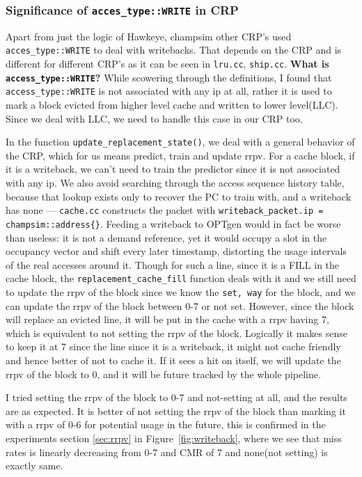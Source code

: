 \documentclass[11pt]{article}
\begin{document}
\subsubsection{Significance of \texttt{acces\_type::WRITE} in CRP} \label{sec:writeback}

Apart from just the logic of Hawkeye, champsim other CRP's used \texttt{acces\_type::WRITE} to deal with writebacks. That depends on the CRP and is different for different CRP's as it can be seen in \texttt{lru.cc}, \texttt{ship.cc}.
\textbf{What is \texttt{access\_type::WRITE}?} While scowering through the definitions, I found that \texttt{access\_type::WRITE} is not associated with any ip at all, rather it is used to mark a block evicted from higher level cache and written to lower level(LLC). Since we deal with LLC, we need to handle this case in our CRP too.  

In the function \texttt{update\_replacement\_state()}, we deal with a general behavior of the CRP, which for us means predict, train and update rrpv. For a cache block, if it is a writeback, we can't need to train the predictor since it is not associated with any ip. We also avoid searching through the access sequence history table, because that lookup
exists only to recover the PC to train with, and a writeback has none --- \texttt{cache.cc}
constructs the packet with \verb|writeback_packet.ip = champsim::address{}|. Feeding a
writeback to OPTgen would in fact be worse than useless: it is not a demand reference, yet
it would occupy a slot in the occupancy vector and shift every later timestamp, distorting
the usage intervals of the real accesses around it. Though for such a line, since it is a FILL in the cache block, the \texttt{replacement\_cache\_fill} function deals with it and we still need to update the rrpv of the block since we know the \texttt{set, way} for the block, and we can update the rrpv of the block between 0-7 or not set. However, since the block will replace an evicted line, it will be put in the cache with a rrpv having 7, which is equivalent to not setting the rrpv of the block. Logically it makes sense to keep it at 7 since the line since it is a writeback, it might not cache friendly and hence better of not to cache it. If it sees a hit on itself, we will update the rrpv of the block to 0, and it will be future tracked by the whole pipeline.

I tried setting the rrpv of the block to 0-7 and not-setting at all, and the results are as expected. It is better of not setting the rrpv of the block than marking it with a rrpv of 0-6 for potential usage in the future, this is confirmed in the experiments section \ref{sec:rrpv} in Figure~\ref{fig:writeback}, where we see that miss rates is linearly decreasing from 0-7 and CMR of 7 and none(not setting) is exactly same.
\end{document}
